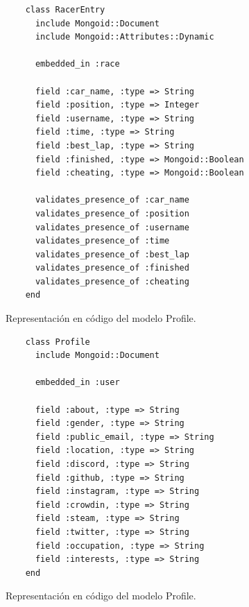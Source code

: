 \begin{listing}
  \begin{verbatim}
    class RacerEntry
      include Mongoid::Document
      include Mongoid::Attributes::Dynamic
      
      embedded_in :race
      
      field :car_name, :type => String
      field :position, :type => Integer
      field :username, :type => String
      field :time, :type => String
      field :best_lap, :type => String
      field :finished, :type => Mongoid::Boolean
      field :cheating, :type => Mongoid::Boolean
      
      validates_presence_of :car_name
      validates_presence_of :position
      validates_presence_of :username
      validates_presence_of :time
      validates_presence_of :best_lap
      validates_presence_of :finished
      validates_presence_of :cheating
    end
  \end{verbatim}
  \caption[Esquema de Profile]{Representación en código del modelo Profile.}
\end{listing}

\begin{listing}
  \begin{verbatim}
    class Profile
      include Mongoid::Document
      
      embedded_in :user
      
      field :about, :type => String
      field :gender, :type => String
      field :public_email, :type => String
      field :location, :type => String
      field :discord, :type => String
      field :github, :type => String
      field :instagram, :type => String
      field :crowdin, :type => String
      field :steam, :type => String
      field :twitter, :type => String
      field :occupation, :type => String
      field :interests, :type => String
    end
  \end{verbatim}
  \caption[Esquema de Profile]{Representación en código del modelo Profile.}
\end{listing}

